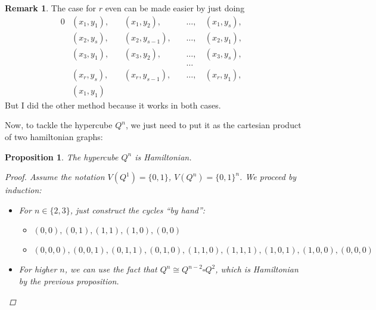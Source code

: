 \documentclass{amsart}
\theoremstyle{plain}
\newtheorem*{proposition}{\textbf{Proposition}}
\theoremstyle{definition}
\newtheorem*{rk}{\textbf{Remark}}
\begin{document}
    \begin{rk}
        The case for $r$ even can be made easier by just doing
        \begin{alignat*}{0}
            & (x_1, y_1),\, && (x_1, y_2),\, && \ldots, \, & (x_1, y_s), & \\
            & (x_2, y_s),\, && (x_2, y_{s-1}),\, && \ldots, \,  & (x_2, y_1), & \\
            & (x_3, y_1),\, && (x_3, y_2),\, && \ldots, \, & (x_3, y_s), & \\
            &&&&& \ldots \\
            & (x_r, y_s),\, && (x_r, y_{s-1}),\, && \ldots, \,  & (x_r, y_1), & \\
            & (x_1, y_1) &&&&&&
        \end{alignat*}
        But I did the other method because it works in both cases.
    \end{rk}
    \noindent Now, to tackle the hypercube $Q^n$, we just need to put it as the cartesian product of two hamiltonian graphs:
    \begin{proposition}
        The hypercube $Q^n$ is Hamiltonian.
        \begin{proof}
            Assume the notation $V(Q^1) = \{0, 1\}$, $V(Q^n) = \{0, 1\}^n$.
            We proceed by induction:
            \begin{itemize}
                \item For $n \in \{2, 3\}$, just construct the cycles ``by hand'':
                \begin{itemize}
                    \item $(0, 0), (0, 1), (1, 1), (1, 0), (0, 0)$
                    \item $(0, 0, 0), (0, 0, 1), (0, 1, 1), (0, 1, 0), (1, 1, 0), (1, 1, 1), (1, 0, 1), (1, 0, 0), (0, 0, 0)$
                \end{itemize}
                \item For higher $n$, we can use the fact that $Q^n \cong Q^{n-2} \square Q^2$, which is Hamiltonian by the previous proposition.
            \end{itemize}
        \end{proof}
    \end{proposition}
\end{document}
